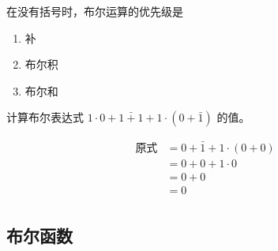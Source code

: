 在没有括号时，布尔运算的优先级是
\begin{enumerate}
    \item 补
    \item 布尔积
    \item 布尔和
\end{enumerate}

\begin{collections}
    \begin{example}
        计算布尔表达式 $1 \cdot 0 + \bar{1 + 1} + 1 \cdot (0 + \bar{1})$ 的值。
    \end{example}

    \begin{solution}
        \begin{equation*}
            \begin{aligned}
                \text{原式} &= 0 + \bar{1} + 1 \cdot (0 + 0) \\
                &= 0 + 0 + 1 \cdot 0 \\
                &= 0 + 0 \\
                &= 0 \\
            \end{aligned}
        \end{equation*}
    \end{solution}
\end{collections}

\subsection{布尔函数}